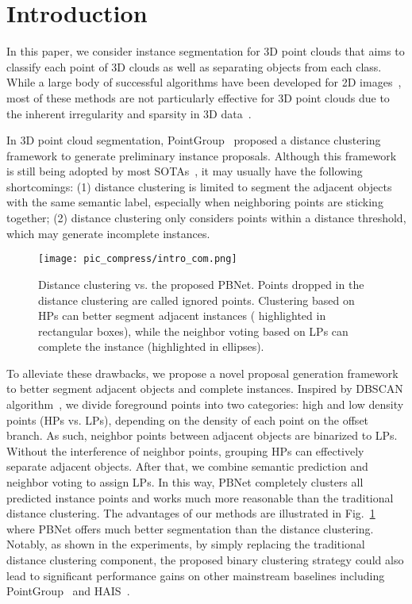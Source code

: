 \documentclass[10pt,twocolumn,letterpaper]{article}
\begin{document}
\section{Introduction}

In this paper, we consider instance segmentation for 3D point clouds that aims to classify each point of 3D clouds as well as separating objects from each class.
While a large body of successful algorithms have been developed for 2D images~\cite{ren2015faster,he2017mask,chen2019hybrid,liu2018path}, most of these methods are not particularly effective for 3D point clouds due to the inherent irregularity and sparsity in 3D data~\cite{dai2017bundlefusion,guo2020deep,yang2022towards}.

In 3D point cloud segmentation, PointGroup~\cite{jiang2020pointgroup} proposed a distance clustering framework to generate preliminary instance proposals. Although this framework is still being adopted by most SOTAs~\cite{he2021dyco3d,liu2021hida,chen2021hierarchical,vu2022softgroup,wu2022dknet}, it may usually have the following shortcomings: (1) distance clustering is limited to segment the adjacent objects with the same semantic label, especially when neighboring points are sticking together; (2) distance clustering only considers points within a distance threshold, which may generate incomplete instances. 

\begin{figure}[t]
  \centering
  \texttt{[image:  pic\_compress/intro\_com.png]}
   \caption{ Distance clustering vs. the proposed PBNet. Points dropped in the distance clustering are called ignored points. Clustering based on HPs can better segment adjacent instances ( highlighted in rectangular boxes), while the neighbor voting based on LPs can complete the instance (highlighted in ellipses).}
   \label{fig:intro_com}
\end{figure}

To alleviate these drawbacks, we propose a novel proposal generation framework to better segment adjacent objects and complete instances. Inspired by DBSCAN algorithm~\cite{ester1996density}, we divide foreground points into two categories: high and low density points (HPs vs. LPs), depending on the density of each point on the offset branch. As such, neighbor points between adjacent objects are binarized to LPs. Without the interference of neighbor points, grouping HPs can effectively separate adjacent objects. After that, we combine semantic prediction and neighbor voting to assign LPs. In this way, PBNet completely clusters all predicted instance points and works much more reasonable than the traditional distance clustering. The advantages of our methods are  illustrated in Fig.~\ref{fig:intro_com} where PBNet offers much better segmentation than the distance clustering. Notably, as shown in the experiments, by simply replacing the traditional distance clustering component,  the proposed binary clustering strategy  could also lead to significant performance gains on other mainstream baselines including PointGroup~\cite{jiang2020pointgroup} and HAIS~\cite{chen2021hierarchical}. 
\end{document}
